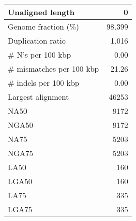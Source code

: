 \documentclass[12pt,a4paper]{article}
\begin{document}
\begin{table}[ht]
\begin{center}
\begin{tabular}{|l*{1}{|r}|}
Unaligned length & 0 \\ \hline
Genome fraction (\%) & 98.399 \\ \hline
Duplication ratio & 1.016 \\ \hline
\# N's per 100 kbp & 0.00 \\ \hline
\# mismatches per 100 kbp & 21.26 \\ \hline
\# indels per 100 kbp & 0.00 \\ \hline
Largest alignment & 46253 \\ \hline
NA50 & 9172 \\ \hline
NGA50 & 9172 \\ \hline
NA75 & 5203 \\ \hline
NGA75 & 5203 \\ \hline
LA50 & 160 \\ \hline
LGA50 & 160 \\ \hline
LA75 & 335 \\ \hline
LGA75 & 335 \\ \hline
\end{tabular}
\end{center}
\end{table}
\end{document}
